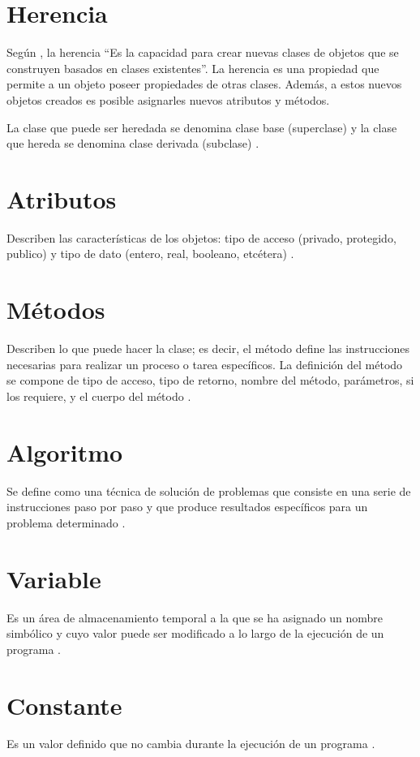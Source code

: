 \section{Herencia}
Según \cite{joyanes1996programacion}, la herencia “Es la capacidad para crear nuevas
clases de objetos que se construyen basados en clases existentes”. La herencia
es una propiedad que permite a un objeto poseer propiedades de otras clases.
Además, a estos nuevos objetos creados es posible asignarles nuevos atributos
y métodos.

La clase que puede ser heredada se denomina clase base (superclase) y la clase
que hereda se denomina clase derivada (subclase) \citep{velarde2006introduccion}.

\section{Atributos}
Describen las características de los objetos: tipo de acceso (privado, protegido, publico) y tipo de dato (entero, real, booleano, etcétera) \citep{izquierdo2007introduccion}. 

\section{Métodos}
Describen lo que puede hacer la clase; es decir, el método define las instrucciones necesarias para realizar un proceso o tarea específicos. La definición del método se compone de tipo de acceso, tipo de retorno, nombre del método, parámetros, si los requiere, y el cuerpo del método \citep{izquierdo2007introduccion}.

\section{Algoritmo}
Se define como una técnica de solución de problemas que consiste en una serie de instrucciones paso por paso y que produce resultados específicos para un problema determinado \citep{izquierdo2007introduccion}. 

\section{Variable}
Es un área de almacenamiento temporal a la que se ha asignado un nombre simbólico y cuyo valor puede ser modificado a lo largo de la ejecución de un programa \citep{izquierdo2007introduccion}. 

\section{Constante}
Es un valor definido que no cambia durante la ejecución de un programa \citep{izquierdo2007introduccion}. 

